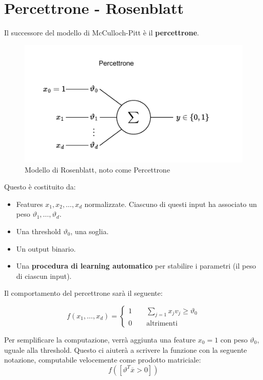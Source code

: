 \section{Percettrone - Rosenblatt}

Il successore del modello di McCulloch-Pitt è il \textbf{percettrone}.
\begin{figure}[tbph]
	\centering
	\includegraphics[width=\linewidth]{./images/percettrone.pdf}
	\caption{Modello di Rosenblatt, noto come Percettrone}
	\label{fig:percettrone}
\end{figure}

Questo è costituito da:
\begin{itemize}
	\item Features $x_1, x_2, \dots, x_d$ normalizzate.  Ciascuno di questi input ha associato un peso $\vartheta_1, \dots, \vartheta_d$.
	\item Una threshold $\vartheta_0$, una soglia.
	\item Un output binario.
	\item Una \textbf{procedura di learning automatico} per stabilire i parametri (il peso di ciascun input).
\end{itemize}

Il comportamento del percettrone sarà il seguente:

$$
f(x_1, \dots, x_d) = \begin{cases}
	1 \qquad \displaystyle\sum_{j=1} x_j v_j \geq \vartheta_0\\
	0 \qquad \text{altrimenti}
\end{cases}
$$

Per semplificare la computazione, verrà aggiunta una feature $x_0 = 1$ con peso $\vartheta_0$, uguale alla threshold. Questo ci aiuterà a scrivere la funzione con la seguente notazione, computabile velocemente come prodotto matriciale: 
$$
f([\vartheta^T \overline{x} > 0])
$$

